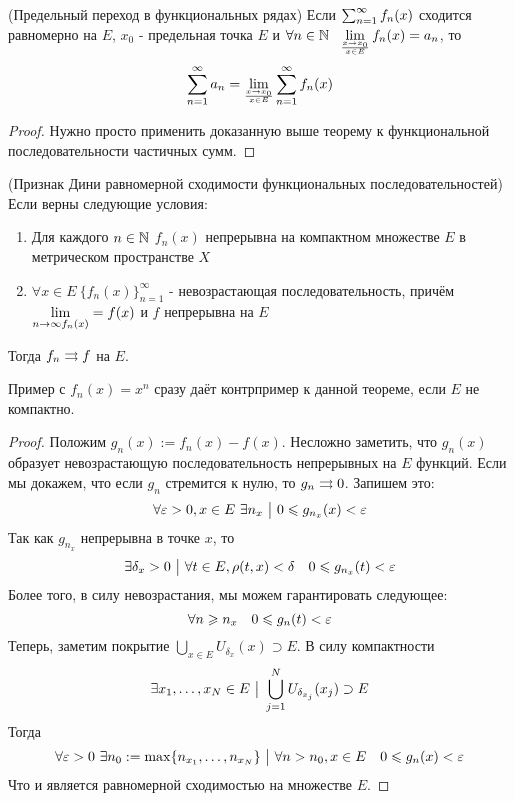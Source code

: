 \begin{theorem} (Предельный переход в функциональных рядах)
	Если $\sum_{n = 1}^\infty f_n(x)$ сходится равномерно на $E$, $x_0$ - предельная точка $E$ и $\forall n \in \mathbb{N}\ \ \lim\limits_{x \to x_0 \over x \in E} f_n(x) = a_n$, то
	\[
		\sum_{n = 1}^\infty a_n = \lim\limits_{x \to x_0 \over x \in E} \sum_{n = 1}^\infty f_n(x)
	\]
\end{theorem}

\begin{proof}
	Нужно просто применить доказанную выше теорему к функциональной последовательности частичных сумм.
\end{proof}

\begin{theorem} (Признак Дини равномерной сходимости функциональных последовательностей)
	Если верны следующие условия:
	\begin{enumerate}
		\item Для каждого $n \in \mathbb{N}$ $f_n(x)$ непрерывна на компактном множестве $E$ в метрическом пространстве $X$
		
		\item $\forall x \in E\ \{f_n(x)\}_{n = 1}^\infty$ - невозрастающая последовательность, причём $\lim\limits_{n \to \infty f_n(x)} = f(x)$ и $f$ непрерывна на $E$
	\end{enumerate}
	Тогда $f_n \rightrightarrows f$ на $E$.	
\end{theorem}

\begin{note}
	Пример с $f_n(x) = x^n$ сразу даёт контрпример к данной теореме, если $E$ не компактно.
\end{note}

\begin{proof}
	Положим $g_n(x) := f_n(x) - f(x)$. Несложно заметить, что $g_n(x)$ образует невозрастающую последовательность непрерывных на $E$ функций. Если мы докажем, что если $g_n$ стремится к нулю, то $g_n \rightrightarrows 0$. Запишем это:
	\[
		\forall \eps > 0, x \in E\ \exists n_x \such 0 \le g_{n_x}(x) < \eps
	\]
	Так как $g_{n_x}$ непрерывна в точке $x$, то
	\[
		\exists \delta_x > 0 \ \big|\  \forall t \in E, \rho(t, x) < \delta \quad 0 \leqslant g_{n_x}(t) < \varepsilon
	\]
	Более того, в силу невозрастания, мы можем гарантировать следующее:
	\[
		\forall n \geqslant n_x \quad 0 \leqslant g_n(t) < \varepsilon
	\]
	Теперь, заметим покрытие $\bigcup_{x \in E} U_{\delta_x}(x) \supset E$. В силу компактности
	\[
		\exists x_1, \ldots, x_N \in E \ \big|\  \bigcup_{j = 1}^N U_{\delta_{x_j}}(x_j) \supset E
	\]
	Тогда
	\[
		\forall \eps > 0\ \exists n_0 := \max \{n_{x_1}, \ldots, n_{x_N}\} \such \forall n > n_0, x \in E \quad 0 \le g_n(x) < \eps
	\]
	Что и является равномерной сходимостью на множестве $E$.
\end{proof}

